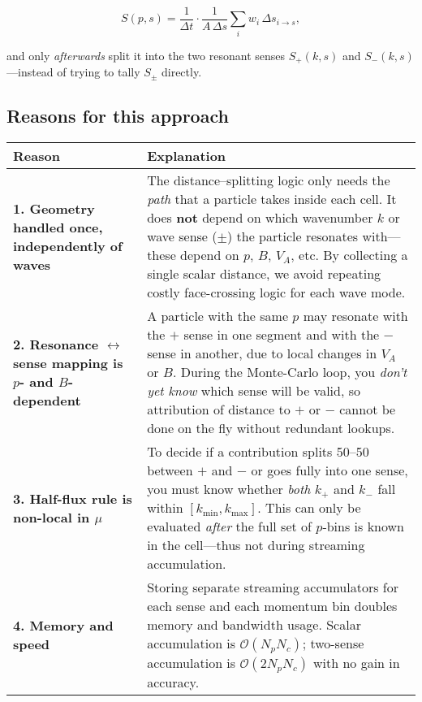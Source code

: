 {\[
S(p, s) = \frac{1}{\Delta t} \cdot \frac{1}{A\,\Delta s}
          \sum_i w_i\,\Delta s_{i \to s},
\]

and only \emph{afterwards} split it into the two resonant senses $S_{+}(k, s)$ and $S_{-}(k, s)$—instead of trying to tally $S_{\pm}$ directly.

\subsection*{Reasons for this approach}

\begin{table}[h!]
\centering
\renewcommand{\arraystretch}{1.4}
\begin{tabular}{|p{3.5cm}|p{11.5cm}|}
\hline
\textbf{Reason} & \textbf{Explanation} \\
\hline

\textbf{1. Geometry handled once, independently of waves} &
The distance–splitting logic only needs the \emph{path} that a particle takes inside each cell. It does \textbf{not} depend on which wavenumber $k$ or wave sense ($\pm$) the particle resonates with—these depend on $p$, $B$, $V_A$, etc. By collecting a single scalar distance, we avoid repeating costly face-crossing logic for each wave mode. \\
\hline

\textbf{2. Resonance $\leftrightarrow$ sense mapping is $p$- and $B$-dependent} &
A particle with the same $p$ may resonate with the $+$ sense in one segment and with the $-$ sense in another, due to local changes in $V_A$ or $B$. During the Monte-Carlo loop, you \emph{don’t yet know} which sense will be valid, so attribution of distance to $+$ or $-$ cannot be done on the fly without redundant lookups. \\
\hline

\textbf{3. Half-flux rule is non-local in $\mu$} &
To decide if a contribution splits 50–50 between $+$ and $-$ or goes fully into one sense, you must know whether \emph{both} $k_{+}$ and $k_{-}$ fall within $[k_{\min}, k_{\max}]$. This can only be evaluated \emph{after} the full set of $p$-bins is known in the cell—thus not during streaming accumulation. \\
\hline

\textbf{4. Memory and speed} &
Storing separate streaming accumulators for each sense and each momentum bin doubles memory and bandwidth usage. Scalar accumulation is $\mathcal{O}(N_p N_c)$; two-sense accumulation is $\mathcal{O}(2N_p N_c)$ with no gain in accuracy. \\
\hline


\end{tabular}
\end{table}}
